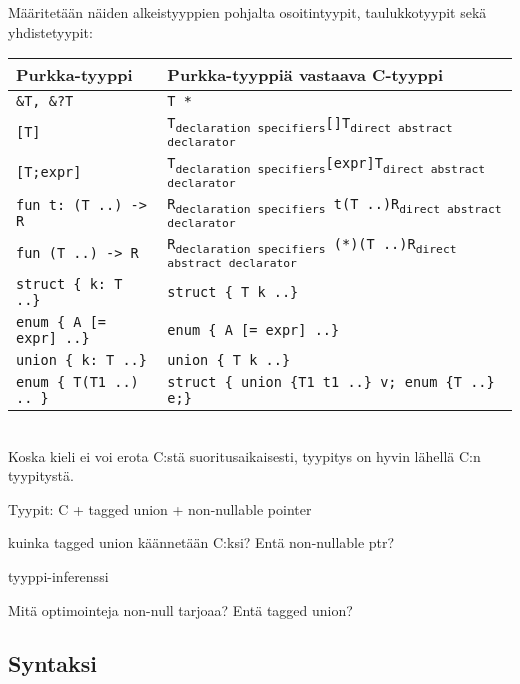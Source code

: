 Määritetään näiden alkeistyyppien pohjalta osoitintyypit, taulukkotyypit sekä
yhdistetyypit: \\[0.3cm]
\begin{tabular}{@{}ll@{}} \toprule
    Purkka-tyyppi & Purkka-tyyppiä vastaava C-tyyppi \\ \midrule
    \texttt{\&T, \&?T} & \texttt{T *} \\[0.2cm]

    \texttt{[T]} & \texttt{T\textsubscript{declaration specifiers}[]T\textsubscript{direct abstract declarator}} \\
    \texttt{[T;expr]} & \texttt{T\textsubscript{declaration specifiers}[expr]T\textsubscript{direct abstract declarator}} \\[0.2cm]

    \texttt{fun t: (T ..) -> R} & \texttt{R\textsubscript{declaration specifiers}~t(T ..)R\textsubscript{direct abstract declarator}} \\
    \texttt{fun (T ..) -> R} & \texttt{R\textsubscript{declaration specifiers}~(*)(T ..)R\textsubscript{direct abstract declarator}} \\[0.2cm]

    \texttt{struct \{ k: T ..\}} & \texttt{struct \{ T k ..\}} \\
    \texttt{enum \{ A [= expr] ..\}} & \texttt{enum \{ A [= expr] ..\}} \\
    \texttt{union \{ k: T ..\}} & \texttt{union \{ T k ..\}} \\[0.2cm]

    \texttt{enum \{ T(T1 ..) .. \}} & \texttt{struct \{ union \{T1 t1 ..\} v; enum \{T ..\} e;\}} \\
    \bottomrule
\end{tabular} \\

Koska kieli ei voi erota C:stä suoritusaikaisesti, tyypitys on hyvin lähellä
C:n tyypitystä.

Tyypit:
 C + tagged union + non-nullable pointer

kuinka tagged union käännetään C:ksi? Entä non-nullable ptr?

tyyppi-inferenssi

Mitä optimointeja non-null tarjoaa? Entä tagged union?

\subsection{Syntaksi}


